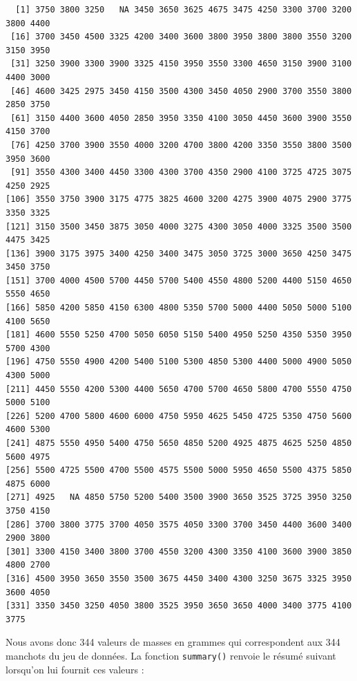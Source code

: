 \documentclass[
  a4paper,
  DIV=11,
  numbers=noendperiod,
  oneside]{scrreprt}
\newenvironment{Shaded}{}{}
\newcommand{\FunctionTok}[1]{\textcolor[rgb]{0.44,0.26,0.76}{#1}}
\newcommand{\NormalTok}[1]{\textcolor[rgb]{0.14,0.16,0.18}{#1}}
\newcommand{\SpecialCharTok}[1]{\textcolor[rgb]{0.00,0.36,0.77}{#1}}
\begin{document}
\begin{Shaded}
\end{Shaded}

\begin{verbatim}
  [1] 3750 3800 3250   NA 3450 3650 3625 4675 3475 4250 3300 3700 3200 3800 4400
 [16] 3700 3450 4500 3325 4200 3400 3600 3800 3950 3800 3800 3550 3200 3150 3950
 [31] 3250 3900 3300 3900 3325 4150 3950 3550 3300 4650 3150 3900 3100 4400 3000
 [46] 4600 3425 2975 3450 4150 3500 4300 3450 4050 2900 3700 3550 3800 2850 3750
 [61] 3150 4400 3600 4050 2850 3950 3350 4100 3050 4450 3600 3900 3550 4150 3700
 [76] 4250 3700 3900 3550 4000 3200 4700 3800 4200 3350 3550 3800 3500 3950 3600
 [91] 3550 4300 3400 4450 3300 4300 3700 4350 2900 4100 3725 4725 3075 4250 2925
[106] 3550 3750 3900 3175 4775 3825 4600 3200 4275 3900 4075 2900 3775 3350 3325
[121] 3150 3500 3450 3875 3050 4000 3275 4300 3050 4000 3325 3500 3500 4475 3425
[136] 3900 3175 3975 3400 4250 3400 3475 3050 3725 3000 3650 4250 3475 3450 3750
[151] 3700 4000 4500 5700 4450 5700 5400 4550 4800 5200 4400 5150 4650 5550 4650
[166] 5850 4200 5850 4150 6300 4800 5350 5700 5000 4400 5050 5000 5100 4100 5650
[181] 4600 5550 5250 4700 5050 6050 5150 5400 4950 5250 4350 5350 3950 5700 4300
[196] 4750 5550 4900 4200 5400 5100 5300 4850 5300 4400 5000 4900 5050 4300 5000
[211] 4450 5550 4200 5300 4400 5650 4700 5700 4650 5800 4700 5550 4750 5000 5100
[226] 5200 4700 5800 4600 6000 4750 5950 4625 5450 4725 5350 4750 5600 4600 5300
[241] 4875 5550 4950 5400 4750 5650 4850 5200 4925 4875 4625 5250 4850 5600 4975
[256] 5500 4725 5500 4700 5500 4575 5500 5000 5950 4650 5500 4375 5850 4875 6000
[271] 4925   NA 4850 5750 5200 5400 3500 3900 3650 3525 3725 3950 3250 3750 4150
[286] 3700 3800 3775 3700 4050 3575 4050 3300 3700 3450 4400 3600 3400 2900 3800
[301] 3300 4150 3400 3800 3700 4550 3200 4300 3350 4100 3600 3900 3850 4800 2700
[316] 4500 3950 3650 3550 3500 3675 4450 3400 4300 3250 3675 3325 3950 3600 4050
[331] 3350 3450 3250 4050 3800 3525 3950 3650 3650 4000 3400 3775 4100 3775
\end{verbatim}

Nous avons donc 344 valeurs de masses en grammes qui correspondent aux
344 manchots du jeu de données. La fonction \texttt{summary()} renvoie
le résumé suivant lorsqu'on lui fournit ces valeurs :

\begin{Shaded}
\end{Shaded}
\end{document}
